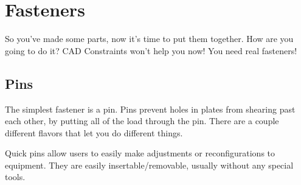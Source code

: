 \documentclass[10pt,letterpaper]{book}
\begin{document}
	\section{Fasteners}
	So you've made some parts, now it's time to put them together. How are you going to do it? CAD Constraints won't help you now! You need real fasteners!
	
	\subsection{Pins}
	The simplest fastener is a pin. Pins prevent holes in plates from shearing past each other, by putting all of the load through the pin. There are a couple different flavors that let you do different things.
	
	Quick pins allow users to easily make adjustments or reconfigurations to equipment. They are easily insertable/removable, usually without any special tools.
	
\end{document}
